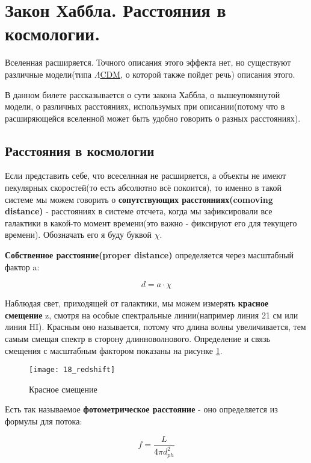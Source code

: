 
\section{ Закон Хаббла. Расстояния в космологии.}

Вселенная расширяется. Точного описания этого эффекта нет, но существуют различные модели(типа \href{https://en.wikipedia.org/wiki/Lambda-CDM_model}{$\Lambda$CDM}, о которой также пойдет речь) описания этого.

В данном билете рассказывается о сути закона Хаббла, о вышеупомянутой модели, о различных расстояниях, использумых при описании(потому что в расширяющейся вселенной может быть удобно говорить о разных расстояниях).

\subsection{Расстояния в космологии}

Если представить себе, что всеселнная не расширяется, а объекты не имеют пекулярных скоростей(то есть абсолютно всё покоится), то именно в такой системе мы можем говорить о \textbf{сопутствующих расстояниях(comoving distance)} - расстояниях в системе отсчета, когда мы зафиксировали все галактики в какой-то момент времени(это важно - фиксируют его для текущего времени). Обозначать его я буду буквой $\chi$.

\textbf{Собственное расстояние(proper distance)} определяется через масштабный фактор a:

\begin{equation}
d = a \cdot \chi
\label{eq:18_proper}
\end{equation}

Наблюдая свет, приходящей от галактики, мы можем измерять \textbf{красное смещение} z, смотря на особые спектральные линии(например линия 21 см или линия HI). Красным оно называется, потому что длина волны увеличивается, тем самым смещая спектр в сторону длинноволнового. Определение и связь смещения с масштабным фактором показаны на рисунке \ref{fig:18_redshift}.

\begin{figure}[H]
	\centering
	\texttt{[image: 18\_redshift]}
	\caption{Красное смещение}
	\label{fig:18_redshift}
\end{figure}

Есть так называемое \textbf{фотометрическое расстояние} - оно определяется из формулы для потока:

\begin{equation}
f = \frac{L}{4 \pi d_{ph}^2}
\label{eq:18_photometric}
\end{equation}

